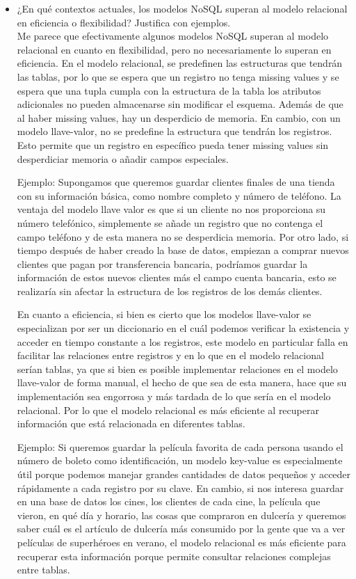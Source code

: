 \documentclass[12pt]{report}
\begin{document}
\begin{enumerate}[label=\textbf{\arabic*.}, leftmargin=*]
\begin{enumerate}[label=\textbf{\alph*.}, leftmargin=*, itemsep=1.0em]
\begin{itemize}
  \item ¿En qu\'e contextos actuales, los modelos NoSQL superan al modelo relacional en eficiencia o flexibilidad? Justifica con ejemplos.\\
    Me parece que efectivamente algunos modelos NoSQL superan al modelo relacional en cuanto en flexibilidad, pero no necesariamente lo superan en eficiencia.
    En el modelo relacional, se predefinen las estructuras que tendrán las tablas, por lo que se espera que un registro no tenga missing values y se espera que una tupla cumpla con la estructura de la tabla los atributos adicionales no pueden almacenarse sin modificar el esquema.
    Además de que al haber missing values, hay un desperdicio de memoria.
    En cambio, con un modelo llave-valor, no se predefine la estructura que tendrán los registros. Esto permite que un registro en específico pueda tener missing values sin desperdiciar memoria o añadir campos especiales.

    Ejemplo: Supongamos que queremos guardar clientes finales de una tienda con su información básica, como nombre completo y número de teléfono.
    La ventaja del modelo llave valor es que si un cliente no nos proporciona su número telefónico, simplemente se añade un registro que no contenga el campo teléfono y de esta manera no se desperdicia memoria.
    Por otro lado, si tiempo después de haber creado la base de datos, empiezan a comprar nuevos clientes que pagan por transferencia bancaria, podríamos guardar la información de estos nuevos clientes más el campo cuenta bancaria, esto se realizaría sin afectar la estructura de los registros de los demás clientes.

    En cuanto a eficiencia, si bien es cierto que los modelos llave-valor se especializan por ser un diccionario en el cuál podemos verificar la existencia y acceder en tiempo constante a los registros, este modelo en particular falla en facilitar las relaciones entre registros y en lo que en el modelo relacional serían tablas, ya que si bien es posible implementar relaciones en el modelo llave-valor de forma manual, el hecho de que sea de esta manera, hace que su implementación sea engorrosa y más tardada de lo que sería en el modelo relacional. Por lo que el modelo relacional es más eficiente al recuperar información que está relacionada en diferentes tablas.

    Ejemplo: Si queremos guardar la película favorita de cada persona usando el número de boleto como identificación, un modelo key-value es especialmente útil porque podemos manejar grandes cantidades de datos pequeños y acceder rápidamente a cada registro por su clave.
    En cambio, si nos interesa guardar en una base de datos los cines, los clientes de cada cine, la película que vieron, en qué día y horario, las cosas que compraron en dulcería y queremos saber cuál es el artículo de dulcería más consumido por la gente que va a ver películas de superhéroes en verano, el modelo relacional es más eficiente para recuperar esta información porque permite consultar relaciones complejas entre tablas.


\end{itemize}
\end{enumerate}
\end{enumerate}
\end{document}
